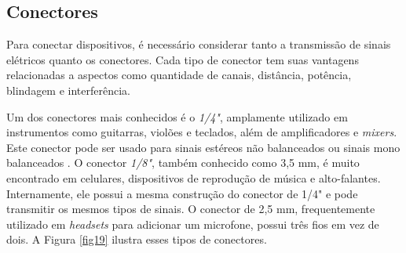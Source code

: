 \subsection{Conectores} %

Para conectar dispositivos, é necessário considerar tanto a transmissão de sinais elétricos quanto os conectores. Cada tipo de conector tem suas vantagens relacionadas a aspectos como quantidade de canais, distância, potência, blindagem e interferência.

Um dos conectores mais conhecidos é o \textit{1/4"}, %
amplamente utilizado em instrumentos como guitarras, violões e teclados, além de amplificadores e \textit{mixers}. Este conector pode ser usado para sinais estéreos não balanceados ou sinais mono balanceados \cite{bartlett}.
O conector \textit{1/8"},%
também conhecido como 3,5 mm, é muito encontrado em celulares, dispositivos de reprodução de música e alto-falantes. Internamente, ele possui a mesma construção do conector de 1/4" e pode transmitir os mesmos tipos de sinais.
O conector de 2,5 mm, frequentemente utilizado em \textit{headsets} para adicionar um microfone, possui três fios em vez de dois. A Figura \ref{fig19} ilustra esses tipos de conectores.

